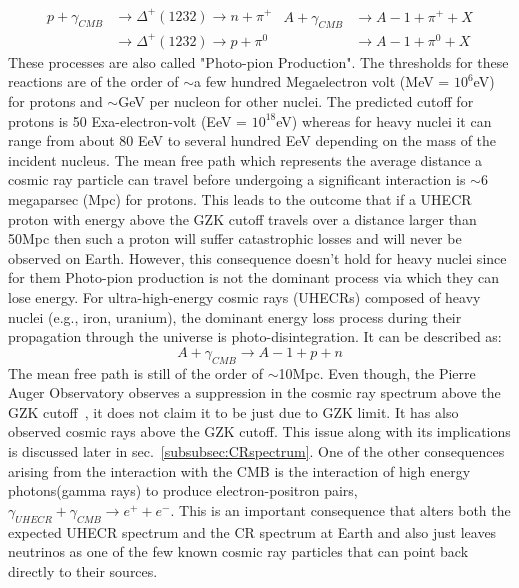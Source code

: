 \begin{equation}\label{eq:GZK}
  \begin{split}
    p + \gamma_{CMB} &\longrightarrow \Delta^+(1232 ) \longrightarrow n+\pi^+ \\ 
                     &\longrightarrow \Delta^+(1232 ) \longrightarrow p+\pi^0
  \end{split} 
  \begin{split}
    A + \gamma_{CMB} &\longrightarrow A-1 + \pi^+ + X \\ 
                     &\longrightarrow A-1 + \pi^0 + X
  \end{split} 
\end{equation}
These processes are also called "Photo-pion Production". The thresholds for these reactions are of the order of $\sim$a few hundred Megaelectron volt (MeV = $10^6$eV) for protons and $\sim$GeV per nucleon for other nuclei. The predicted cutoff for protons is 50 Exa-electron-volt (EeV = $10^{18}$eV) whereas for heavy nuclei it can range from about 80 EeV to several hundred EeV depending on the mass of the incident nucleus. The mean free path which represents the average distance a cosmic ray particle can travel before undergoing a significant interaction is $\sim$6 megaparsec (Mpc) for protons. This leads to the outcome that if a UHECR proton with energy above the GZK cutoff travels over a distance larger than 50Mpc then such a proton will suffer catastrophic losses and will never be observed on Earth. However, this consequence doesn't hold for heavy nuclei since for them Photo-pion production is not the dominant process via which they can lose energy. For ultra-high-energy cosmic rays (UHECRs) composed of heavy nuclei (e.g., iron, uranium), the dominant energy loss process during their propagation through the universe is photo-disintegration. It can be described as:
\begin{equation}\label{eq:Pdisinteg}
    A + \gamma_{CMB} \longrightarrow A-1 + p + n  
\end{equation}
The mean free path is still of the order of $\sim$10Mpc.
Even though, the Pierre Auger Observatory observes a suppression in the cosmic ray spectrum above the GZK cutoff~\cite{KAMPERT2014318}, it does not claim it to be just due to GZK limit. It has also observed cosmic rays above the GZK cutoff. This issue along with its implications is discussed later in sec.~\ref{subsubsec:CRspectrum}. One of the other consequences arising from the interaction with the CMB is the interaction of high energy photons(gamma rays) to produce electron-positron pairs, $\gamma_{UHECR} + \gamma_{CMB} \longrightarrow e^+ + e^- $. This is an important consequence that alters both the expected UHECR spectrum and the CR spectrum at Earth and also just leaves neutrinos as one of the few known cosmic ray particles that can point back directly to their sources.

